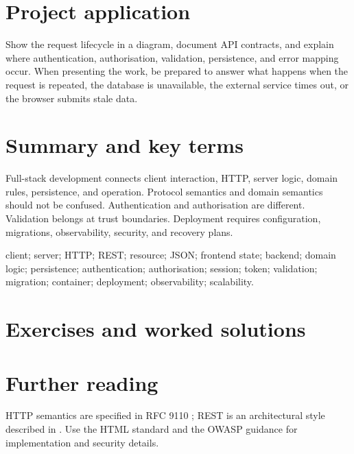 \section{Project application}
Show the request lifecycle in a diagram, document API contracts, and explain where authentication, authorisation, validation, persistence, and error mapping occur. When presenting the work, be prepared to answer what happens when the request is repeated, the database is unavailable, the external service times out, or the browser submits stale data.

\section{Summary and key terms}
Full-stack development connects client interaction, HTTP, server logic, domain rules, persistence, and operation. Protocol semantics and domain semantics should not be confused. Authentication and authorisation are different. Validation belongs at trust boundaries. Deployment requires configuration, migrations, observability, security, and recovery plans.

\begin{keyterms}client; server; HTTP; REST; resource; JSON; frontend state; backend; domain logic; persistence; authentication; authorisation; session; token; validation; migration; container; deployment; observability; scalability.\end{keyterms}

\section{Exercises and worked solutions}



\section{Further reading}
HTTP semantics are specified in RFC 9110 \citep{rfc9110}; REST is an architectural style described in \citet{fielding2000architectural}. Use the HTML standard \citep{whatwghtml} and the OWASP guidance \citep{owasptop10} for implementation and security details.
